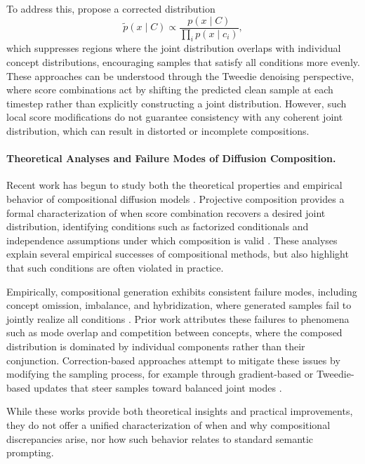 \documentclass{article}
\begin{document}
To address this, \citep{dutta2026steer} propose a corrected distribution
\begin{equation}
\tilde p(x \mid C) \propto \frac{p(x \mid C)}{\prod_i p(x \mid c_i)},
\end{equation}
which suppresses regions where the joint distribution overlaps with individual concept distributions, encouraging samples that satisfy all conditions more evenly. 
These approaches can be understood through the Tweedie denoising perspective, where score combinations act by shifting the predicted clean sample at each timestep rather than explicitly constructing a joint distribution. 
However, such local score modifications do not guarantee consistency with any coherent joint distribution, which can result in distorted or incomplete compositions.

\paragraph{Theoretical Analyses and Failure Modes of Diffusion Composition.}
Recent work has begun to study both the theoretical properties and empirical behavior of compositional diffusion models \citep{bradley2025mechanisms, du2024compositional, dutta2026steer}. 
Projective composition provides a formal characterization of when score combination recovers a desired joint distribution, identifying conditions such as factorized conditionals and independence assumptions under which composition is valid \citep{bradley2025mechanisms}. 
These analyses explain several empirical successes of compositional methods, but also highlight that such conditions are often violated in practice.

Empirically, compositional generation exhibits consistent failure modes, including concept omission, imbalance, and hybridization, where generated samples fail to jointly realize all conditions \citep{dutta2026steer}. 
Prior work attributes these failures to phenomena such as mode overlap and competition between concepts, where the composed distribution is dominated by individual components rather than their conjunction. 
Correction-based approaches attempt to mitigate these issues by modifying the sampling process, for example through gradient-based or Tweedie-based updates that steer samples toward balanced joint modes \citep{dutta2026steer}. 

While these works provide both theoretical insights and practical improvements, they do not offer a unified characterization of when and why compositional discrepancies arise, nor how such behavior relates to standard semantic prompting.
\end{document}
